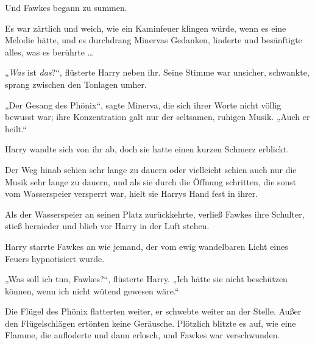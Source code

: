 Und Fawkes begann zu summen.

Es war zärtlich und weich, wie ein Kaminfeuer klingen würde, wenn es eine Melodie hätte, und es durchdrang Minervas Gedanken, linderte und besänftigte alles, was es berührte …

„\emph{Was} ist \emph{das}?“, flüsterte Harry neben ihr. Seine Stimme war unsicher, schwankte, sprang zwischen den Tonlagen umher.

„Der Gesang des Phönix“, sagte Minerva, die sich ihrer Worte nicht völlig bewusst war; ihre Konzentration galt nur der seltsamen, ruhigen Musik. „Auch er heilt.“

Harry wandte sich von ihr ab, doch sie hatte einen kurzen Schmerz erblickt.

Der Weg hinab schien sehr lange zu dauern oder vielleicht schien auch nur die Musik sehr lange zu dauern, und als sie durch die Öffnung schritten, die sonst vom Wasserspeier versperrt war, hielt sie Harrys Hand fest in ihrer.

Als der Wasserspeier an seinen Platz zurückkehrte, verließ Fawkes ihre Schulter, stieß hernieder und blieb vor Harry in der Luft stehen.

Harry starrte Fawkes an wie jemand, der vom ewig wandelbaren Licht eines Feuers hypnotisiert wurde.

„Was soll ich tun, Fawkes?“, flüsterte Harry. „Ich hätte sie nicht beschützen können, wenn ich nicht wütend gewesen wäre.“

Die Flügel des Phönix flatterten weiter, er schwebte weiter an der Stelle. Außer den Flügelschlägen ertönten keine Geräusche. Plötzlich blitzte es auf, wie eine Flamme, die aufloderte und dann erlosch, und Fawkes war verschwunden.


